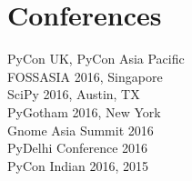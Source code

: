 \documentclass[]{deedy-resume-openfont}
\begin{document}
\begin{minipage}[t]{0.33\textwidth}

\section{Conferences}
PyCon UK, PyCon Asia Pacific \\
FOSSASIA 2016, Singapore \\
SciPy 2016, Austin, TX \\
PyGotham 2016, New York \\
\textbullet{} Gnome Asia Summit 2016 \\
\textbullet{} PyDelhi Conference 2016 \\
\textbullet{} PyCon Indian 2016, 2015
\sectionsep

%
%

\end{minipage} 
\hfill
\end{document}
